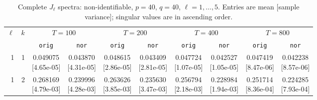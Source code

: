 \documentclass[12pt,letterpaper]{article}
\def\spacingset#1{\renewcommand{\baselinestretch}{#1}\small\normalsize}
\theoremstyle{plain}
\theoremstyle{definition}
\begin{document}
\clearpage
\begin{table}[p]
\begingroup
\spacingset{1.0}
\small\centering
\caption{Complete $J_\ell$ spectra: non-identifiable, $p=40$, $q=40$, $\ell=1,\ldots,5$. Entries are mean [sample variance]; singular values are in ascending order.}
\label{s23:lambda:alltab:spectra:p40q40exterior:1-5}
\footnotesize
\setlength{\tabcolsep}{2.2pt}
\renewcommand{\arraystretch}{1.03}
\begin{adjustbox}{max width=\linewidth}
\begin{tabular}{@{}rr*{8}{c}@{}}
\toprule
$\ell$ & $k$ & \multicolumn{2}{c}{$T=100$} & \multicolumn{2}{c}{$T=200$} & \multicolumn{2}{c}{$T=400$} & \multicolumn{2}{c}{$T=800$}\\
\cmidrule(lr){3-4}\cmidrule(lr){5-6}\cmidrule(lr){7-8}\cmidrule(lr){9-10}
 &  & \texttt{orig} & \texttt{nor} & \texttt{orig} & \texttt{nor} & \texttt{orig} & \texttt{nor} & \texttt{orig} & \texttt{nor}\\
\midrule
1 & 1 & \shortstack{0.049075\\[-1pt]{\scriptsize[4.65e-05]}} & \shortstack{0.043870\\[-1pt]{\scriptsize[4.31e-05]}} & \shortstack{0.048615\\[-1pt]{\scriptsize[2.86e-05]}} & \shortstack{0.043409\\[-1pt]{\scriptsize[2.81e-05]}} & \shortstack{0.047724\\[-1pt]{\scriptsize[1.07e-05]}} & \shortstack{0.042527\\[-1pt]{\scriptsize[1.05e-05]}} & \shortstack{0.047419\\[-1pt]{\scriptsize[8.47e-06]}} & \shortstack{0.042238\\[-1pt]{\scriptsize[8.57e-06]}}\\
1 & 2 & \shortstack{0.268169\\[-1pt]{\scriptsize[4.79e-03]}} & \shortstack{0.239996\\[-1pt]{\scriptsize[4.28e-03]}} & \shortstack{0.263626\\[-1pt]{\scriptsize[3.85e-03]}} & \shortstack{0.235630\\[-1pt]{\scriptsize[3.47e-03]}} & \shortstack{0.256794\\[-1pt]{\scriptsize[2.18e-03]}} & \shortstack{0.228984\\[-1pt]{\scriptsize[1.94e-03]}} & \shortstack{0.251714\\[-1pt]{\scriptsize[8.36e-04]}} & \shortstack{0.224285\\[-1pt]{\scriptsize[7.93e-04]}}\\

\end{tabular}
\end{adjustbox}
\end{table}
\end{document}
